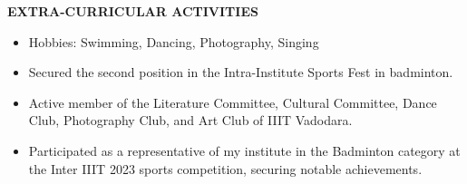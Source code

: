 \documentclass[a4paper,10pt]{article}
\newcommand{\resheading}[1]{\medskip
    \colorbox{mygrey}{\begin{minipage}{\dimexpr\textwidth-2\fboxsep\relax}\small 
                        \textbf{#1 \vphantom{p\^{E}}}
                      \end{minipage}}
                            \par\medskip}
\begin{document}
\resheading{EXTRA-CURRICULAR ACTIVITIES}
    \begin{itemize}
    \item Hobbies: Swimming, Dancing, Photography, Singing
    
\item Secured the second position in the Intra-Institute Sports Fest in badminton.

\item Active member of the Literature Committee, Cultural Committee, Dance Club, Photography Club, and Art Club of IIIT Vadodara.

\item   Participated as a representative of my institute in the Badminton category at the Inter IIIT 2023 sports competition, securing notable achievements.

    \end{itemize}
\end{document}
